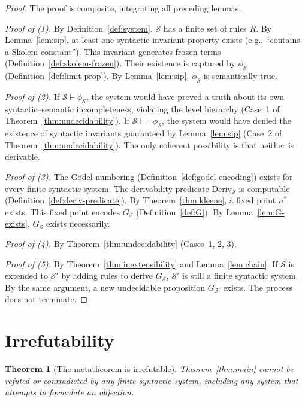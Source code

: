 \documentclass[11pt]{article}
\newtheorem{theorem}{Theorem}[section]
\begin{document}
\begin{proof}
The proof is composite, integrating all preceding lemmas.

\emph{Proof of (1).}
By Definition~\ref{def:system}, $\mathcal{S}$ has a finite set of rules
$R$. By Lemma~\ref{lem:sip}, at least one syntactic invariant property
exists (e.g., ``contains a Skolem constant''). This invariant generates
frozen terms (Definition~\ref{def:skolem-frozen}). Their existence is
captured by $\phi_{\mathcal{S}}$ (Definition~\ref{def:limit-prop}). By
Lemma~\ref{lem:sip}, $\phi_{\mathcal{S}}$ is semantically true.

\emph{Proof of (2).}
If $\mathcal{S} \vdash \phi_{\mathcal{S}}$, the system would have proved
a truth about its own syntactic--semantic incompleteness, violating the
level hierarchy (Case~1 of Theorem~\ref{thm:undecidability}). If
$\mathcal{S} \vdash \neg \phi_{\mathcal{S}}$, the system would have
denied the existence of syntactic invariants guaranteed by
Lemma~\ref{lem:sip} (Case~2 of Theorem~\ref{thm:undecidability}). The
only coherent possibility is that neither is derivable.

\emph{Proof of (3).}
The G\"odel numbering (Definition~\ref{def:godel-encoding}) exists for
every finite syntactic system. The derivability predicate
$\mathrm{Deriv}_{\mathcal{S}}$ is computable
(Definition~\ref{def:deriv-predicate}). By Theorem~\ref{thm:kleene}, a
fixed point $n^*$ exists. This fixed point encodes $G_{\mathcal{S}}$
(Definition~\ref{def:G}). By Lemma~\ref{lem:G-exists},
$G_{\mathcal{S}}$ exists necessarily.

\emph{Proof of (4).}
By Theorem~\ref{thm:undecidability} (Cases~1, 2, 3).

\emph{Proof of (5).}
By Theorem~\ref{thm:inextensibility} and Lemma~\ref{lem:chain}. If
$\mathcal{S}$ is extended to $\mathcal{S}'$ by adding rules to derive
$G_{\mathcal{S}}$, $\mathcal{S}'$ is still a finite syntactic system.
By the same argument, a new undecidable proposition
$G_{\mathcal{S}'}$ exists. The process does not terminate.
\end{proof}


\section{Irrefutability}
\label{sec:irrefutability}


\begin{theorem}[The metatheorem is irrefutable]
\label{thm:irrefutable}
Theorem~\ref{thm:main} cannot be refuted or contradicted by any finite
syntactic system, including any system that attempts to formulate an
objection.
\end{theorem}
\end{document}
